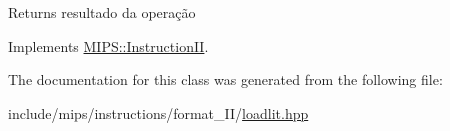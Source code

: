 \begin{DoxyReturn}{Returns}
resultado da operação 
\end{DoxyReturn}


Implements \hyperlink{classMIPS_1_1InstructionII_aa014c5b0fe877746ca4db85c971a2e93}{M\+I\+P\+S\+::\+Instruction\+II}.



The documentation for this class was generated from the following file\+:\begin{DoxyCompactItemize}
\item 
include/mips/instructions/format\+\_\+\+I\+I/\hyperlink{loadlit_8hpp}{loadlit.\+hpp}\end{DoxyCompactItemize}
